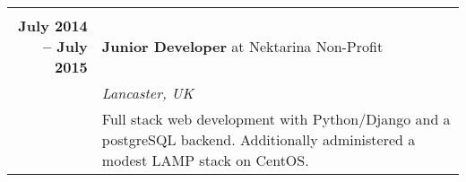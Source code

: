 \documentclass[a4paper,10pt]{article} %
\begin{document}
\begin{tabularx}{\textwidth}{r|X}
\multicolumn{2}{r}{} \\ %

\textbf{July 2014 -- July 2015}     & \textbf{Junior Developer} at {Nektarina Non-Profit}\\
                                    & \emph{Lancaster, UK}\\
                                    & \footnotesize{Full stack web development
                                    with Python/Django and a postgreSQL
                                    backend. Additionally administered a modest
                                    LAMP stack on CentOS.}\\

\end{tabularx}

\end{document}
